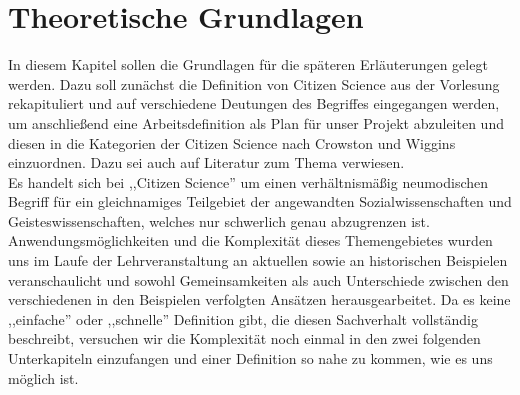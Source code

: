 \documentclass{article}
\begin{document}
\section{Theoretische Grundlagen}
In diesem Kapitel sollen die Grundlagen für die späteren Erläuterungen gelegt werden. Dazu soll zunächst die Definition von Citizen Science aus der Vorlesung rekapituliert und auf verschiedene Deutungen des Begriffes eingegangen werden, um anschließend eine Arbeitsdefinition als Plan für unser Projekt abzuleiten und diesen in die Kategorien der Citizen Science nach  Crowston und Wiggins einzuordnen. Dazu sei auch auf Literatur zum Thema verwiesen.\\
Es handelt sich bei ,,Citizen Science'' um einen verhältnismäßig neumodischen Begriff für ein gleichnamiges Teilgebiet der angewandten Sozialwissenschaften und Geisteswissenschaften, welches nur schwerlich genau abzugrenzen ist. Anwendungsmöglichkeiten und die Komplexität dieses Themengebietes wurden uns im Laufe der Lehrveranstaltung an aktuellen sowie an historischen Beispielen veranschaulicht und sowohl Gemeinsamkeiten als auch Unterschiede zwischen den verschiedenen in den Beispielen verfolgten Ansätzen herausgearbeitet. Da es keine ,,einfache'' oder ,,schnelle'' Definition gibt, die diesen Sachverhalt vollständig beschreibt, versuchen wir die Komplexität noch einmal in den zwei folgenden Unterkapiteln einzufangen und einer Definition so nahe zu kommen, wie es uns möglich ist.
\end{document}
